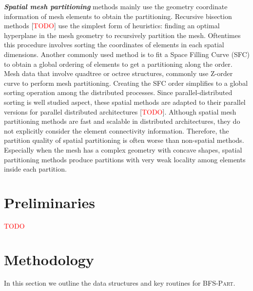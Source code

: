 \documentclass[conference]{IEEEtran}
\newcommand{\bfspart}{\textsc{BFS-Part}\xspace}
\begin{document}
\textbf{\emph{Spatial mesh partitioning}} methods mainly use the geometry coordinate information of mesh elements to obtain the partitioning. Recursive bisection methods [\textcolor{red}{TODO}] use the simplest form of heuristics: finding an optimal hyperplane in the mesh geometry to recursively partition the mesh. Oftentimes this procedure involves sorting the coordinates of elements in each spatial dimensions. Another commonly used method is to fit a Space Filling Curve (SFC) to obtain a global ordering of elements to get a partitioning along the order. Mesh data that involve quadtree or octree structures, commonly use Z-order curve to perform mesh partitioning. Creating the SFC order simplifies to a global sorting operation among the distributed processes. Since parallel-distributed sorting is well studied aspect, these spatial methods are adapted to their parallel versions for parallel distributed architectures [\textcolor{red}{TODO}]. Although spatial mesh partitioning methods are fast and scalable in distributed architectures, they do not explicitly consider the element connectivity information. Therefore, the partition quality of spatial partitioning is often worse than non-spatial methods. Especially when the mesh has a complex geometry with concave shapes, spatial partitioning methods produce partitions with very weak locality among elements inside each partition.


\section{Preliminaries}
\textcolor{red}{TODO}


\section{Methodology}
In this section we outline the data structures and key routines for \bfspart.
\end{document}
